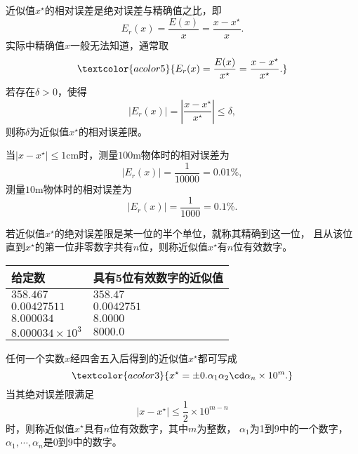 \begin{frame}\ft{\subsecname}\fst{\subsubsecname}


\begin{dingyi}[相对误差与相对误差限]
近似值$x^{\star}$的\textcolor{acolor5}{相对误差}是绝对误差与精确值之比，即
$$
E_r(x) = \frac{E(x)}{x} = \frac{x-x^{\star}}{x}.
$$
实际中精确值$x$一般无法知道，通常取
$$\textcolor{acolor5}{
E_r(x) = \frac{E(x)}{x^{\star}} = \frac{x-x^{\star}}{x^{\star}}.
}
$$
若存在$\delta>0$，使得
$$
|E_r(x)|=|\frac{x-x^{\star}}{x^{\star}}|\le\delta,
$$
则称$\delta$为近似值$x^{\star}$的\textcolor{acolor5}{相对误差限}。
\end{dingyi}


\end{frame}



\begin{frame}\ft{\subsecname}\fst{\subsubsecname}

\begin{li}
当$|x-x^{\star}|\le 1$cm时，测量$100$m物体时的相对误差为
$$
|E_r(x)|=\frac{1}{10000}=0.01\%,
$$
测量$10$m物体时的相对误差为
$$
|E_r(x)|=\frac{1}{1000}=0.1\%.
$$
\end{li}


\end{frame}
 
\begin{frame}[fragile]\ft{\subsecname} 

\begin{dingyi}[有效数字]
若近似值$x^{\star}$的绝对误差限是某一位的半个单位，就称其精确到这一位，
且从该位直到$x^{\star}$的第一位非零数字共有$n$位，则称近似值$x^{\star}$有$n$位有效数字。
\end{dingyi}

\pause
\begin{table}
\begin{tabular}{|l|l|}\hline
给定数& 具有5位有效数字的近似值 \\ \hline
$358.467$            & $358.47$\\
$0.00427511$         & $0.0042751$\\
\textcolor{acolor5}{$8.000034$}  & \textcolor{acolor5}{$8.0000$}\\
$8.000034\times10^3$ & $8000.0$\\\hline
\end{tabular}
\end{table}

\end{frame}
%
%
%
\begin{frame}\ft{\subsecname} 


任何一个实数$x$经四舍五入后得到的近似值$x^{\star}$都可写成
$$\textcolor{acolor3}{
x^{\star} = \pm0.\alpha_1\alpha_2\cd\alpha_n\times 10^m.
}
$$
当其绝对误差限满足
$$
|x-x^{\star}|\le \frac12 \times 10^{m-n}
$$
时，则称近似值$x^{\star}$具有$n$位有效数字，其中$m$为整数，
$\alpha_1$为1到9中的一个数字，$\alpha_1,\cdots,\alpha_n$是0到9中的数字。


\end{frame}



